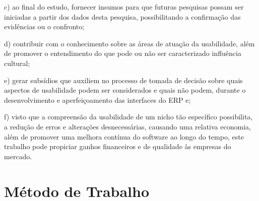 	\begin{flushright}
	\begin{minipage}{.955\textwidth}
		c) ao final do estudo, fornecer insumos para que futuras pesquisas possam ser iniciadas a partir dos dados desta pesquisa, possibilitando a confirmação das evidências ou o confronto;
	\end{minipage}
	\end{flushright}

	\begin{flushright}
	\begin{minipage}{.955\textwidth}
		d) contribuir com o conhecimento sobre as áreas de atuação da usabilidade, além de promover o entendimento do que pode ou não ser caracterizado influência cultural;
	\end{minipage}
	\end{flushright}

	\begin{flushright}
	\begin{minipage}{.955\textwidth}
		e) gerar subsídios que auxiliem no processo de tomada de decisão sobre quais aspectos de usabilidade podem ser considerados e quais não podem, durante o desenvolvimento e aperfeiçoamento das interfaces do ERP e;
	\end{minipage}
	\end{flushright}

	\begin{flushright}
	\begin{minipage}{.955\textwidth}
		f) visto que a compreensão da usabilidade de um nicho tão específico possibilita, a redução de erros e alterações desnecessárias, causando uma relativa economia, além de promover uma melhora contínua do software ao longo do tempo, este trabalho pode propiciar ganhos financeiros e de qualidade às empresas do mercado.		
	\end{minipage}
	\end{flushright}

\section{Método de Trabalho}  \label{Método de Trabalho}


